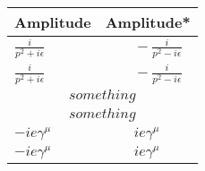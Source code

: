 \documentclass[11pt,a4paper]{article}
\begin{document}
\renewcommand{\arraystretch}{2.3}
\begin{longtable}{l:l}
\textbf{Amplitude} & \textbf{Amplitude*} \\ \hline
$\displaystyle \frac{i}{p^2 + i\epsilon}$ & 
$\qquad \displaystyle -\frac{i}{p^2 - i\epsilon}$ \\
$\displaystyle \frac{i}{p^2 + i\epsilon}$ & 
$\qquad \displaystyle -\frac{i}{p^2 - i\epsilon}$ \\
 \\
 \\
$-ie \gamma^\mu$ & $\qquad ie \gamma^\mu$ \\
$-ie \gamma^\mu$ & $\qquad ie \gamma^\mu$ \\
\end{longtable}
\end{document}
